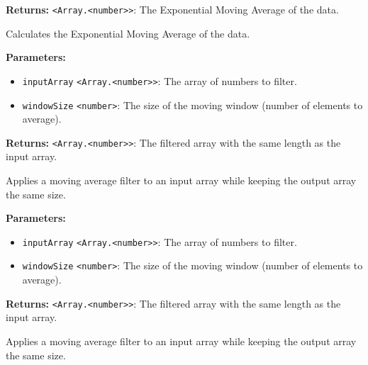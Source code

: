 \documentclass[12pt,a4paper]{article}
\begin{document}
\noindent \textbf{Returns:} \texttt{<Array.<number>>}: The Exponential Moving Average of the data.

\noindent Calculates the Exponential Moving Average of the data.

\vspace{5mm}
\noindent {}


\noindent \textbf{Parameters:}
\begin{itemize}
  \item \texttt{inputArray} \texttt{<Array.<number>>}: The array of numbers to filter.
  \item \texttt{windowSize} \texttt{<number>}: The size of the moving window (number of elements to average).
\end{itemize}

\noindent \textbf{Returns:} \texttt{<Array.<number>>}: The filtered array with the same length as the input array.

\noindent Applies a moving average filter to an input array while keeping the output array the same size.

\vspace{5mm}
\noindent {}


\noindent \textbf{Parameters:}
\begin{itemize}
  \item \texttt{inputArray} \texttt{<Array.<number>>}: The array of numbers to filter.
  \item \texttt{windowSize} \texttt{<number>}: The size of the moving window (number of elements to average).
\end{itemize}

\noindent \textbf{Returns:} \texttt{<Array.<number>>}: The filtered array with the same length as the input array.

\noindent Applies a moving average filter to an input array while keeping the output array the same size.

\vspace{5mm}
\noindent {}
\end{document}
